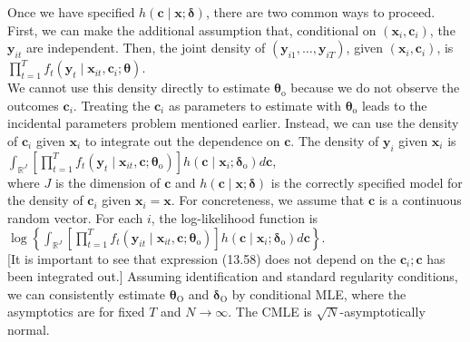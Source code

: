 \documentclass[10pt]{article}
\begin{document}
Once we have specified $h(\mathbf{c} \mid \mathbf{x} ; \boldsymbol{\delta})$, there are two common ways to proceed. First, we can make the additional assumption that, conditional on $\left(\mathbf{x}_{i}, \mathbf{c}_{i}\right)$, the $\mathbf{y}_{i t}$ are independent. Then, the joint density of $\left(\mathbf{y}_{i 1}, \ldots, \mathbf{y}_{i T}\right)$, given $\left(\mathbf{x}_{i}, \mathbf{c}_{i}\right)$, is\\
$\prod_{t=1}^{T} f_{t}\left(\mathbf{y}_{t} \mid \mathbf{x}_{i t}, \mathbf{c}_{i} ; \boldsymbol{\theta}\right)$.\\
We cannot use this density directly to estimate $\boldsymbol{\theta}_{\mathrm{o}}$ because we do not observe the outcomes $\mathbf{c}_{i}$. Treating the $\mathbf{c}_{i}$ as parameters to estimate with $\boldsymbol{\theta}_{\mathrm{o}}$ leads to the incidental parameters problem mentioned earlier. Instead, we can use the density of $\mathbf{c}_{i}$ given $\mathbf{x}_{i}$ to integrate out the dependence on $\mathbf{c}$. The density of $\mathbf{y}_{i}$ given $\mathbf{x}_{i}$ is\\
$\int_{\mathbb{R}^{J}}\left[\prod_{t=1}^{T} f_{t}\left(\mathbf{y}_{t} \mid \mathbf{x}_{i t}, \mathbf{c} ; \boldsymbol{\theta}_{\mathrm{o}}\right)\right] h\left(\mathbf{c} \mid \mathbf{x}_{i} ; \boldsymbol{\delta}_{\mathrm{o}}\right) d \mathbf{c}$,\\
where $J$ is the dimension of $\mathbf{c}$ and $h(\mathbf{c} \mid \mathbf{x} ; \boldsymbol{\delta})$ is the correctly specified model for the density of $\mathbf{c}_{i}$ given $\mathbf{x}_{i}=\mathbf{x}$. For concreteness, we assume that $\mathbf{c}$ is a continuous random vector. For each $i$, the log-likelihood function is\\
$\log \left\{\int_{\mathbb{R}^{J}}\left[\prod_{t=1}^{T} f_{t}\left(\mathbf{y}_{i t} \mid \mathbf{x}_{i t}, \mathbf{c} ; \boldsymbol{\theta}_{\mathrm{o}}\right)\right] h\left(\mathbf{c} \mid \mathbf{x}_{i} ; \boldsymbol{\delta}_{\mathrm{o}}\right) d \mathbf{c}\right\}$.\\[0pt]
[It is important to see that expression (13.58) does not depend on the $\mathbf{c}_{i} ; \mathbf{c}$ has been integrated out.] Assuming identification and standard regularity conditions, we can consistently estimate $\boldsymbol{\theta}_{\mathrm{O}}$ and $\boldsymbol{\delta}_{\mathrm{O}}$ by conditional MLE, where the asymptotics are for fixed $T$ and $N \rightarrow \infty$. The CMLE is $\sqrt{N}$-asymptotically normal.
\end{document}
